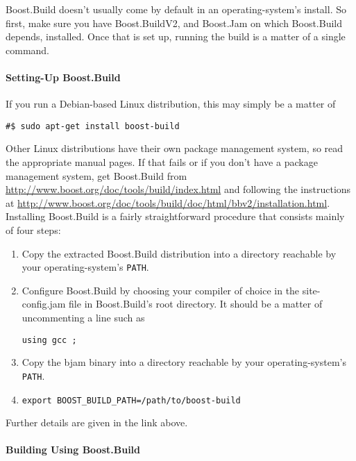 \documentclass{article}
\begin{document}
Boost.Build doesn't usually come by default in an operating-system's install.
So first, make sure you have Boost.BuildV2, and Boost.Jam on which Boost.Build
depends, installed.  Once that is set up, running the build is a matter of a
single command.


\paragraph{Setting-Up Boost.Build}

If you run a Debian-based Linux distribution, this may simply be a matter of

\begin{verbatim}
#$ sudo apt-get install boost-build
\end{verbatim}

Other Linux distributions have their own package management system, so read the
appropriate manual pages.  If that fails or if you don't have a package
management system, get Boost.Build from
\url{http://www.boost.org/doc/tools/build/index.html} and following the instructions
at \url{http://www.boost.org/doc/tools/build/doc/html/bbv2/installation.html}.
Installing Boost.Build is a fairly straightforward procedure that consists
mainly of four steps:

\begin{enumerate}
  \item Copy the extracted Boost.Build distribution into a directory reachable by
    your operating-system's \texttt{PATH}.
  \item Configure Boost.Build by choosing your compiler of choice in the
    site-config.jam file in Boost.Build's root directory.  It should be a
    matter of uncommenting a line such as

   \begin{verbatim}using gcc ;\end{verbatim}

  \item Copy the bjam binary into a directory reachable by your operating-system's
    \texttt{PATH}.
  \item \texttt{export BOOST\_BUILD\_PATH=/path/to/boost-build}
\end{enumerate}

Further details are given in the link above.

\paragraph{Building Using Boost.Build}
\end{document}
